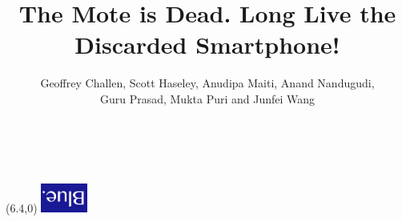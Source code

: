 

\title{The Mote is Dead. Long Live the Discarded Smartphone!}


\author{
\alignauthor
Geoffrey Challen, Scott Haseley, Anudipa Maiti, Anand Nandugudi,\\
Guru Prasad, Mukta Puri and Junfei Wang\\
\\
\\
}

\crdata{}

\maketitle

\ifdefined\isblue
\begin{textblock}{1}(6.4,0)
\noindent\href{http://blue.cse.buffalo.edu}{\includegraphics[width=0.6in]{./figures/logos/blue.jpg}}
\end{textblock}
\fi










{\footnotesize
\renewcommand{\baselinestretch}{0.9}


}


